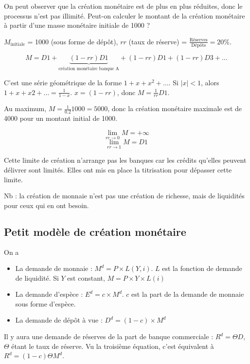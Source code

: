 	On peut observer que la création monétaire est de plus en plus réduites, donc le processus n'est pas illimité. Peut-on calculer le montant de la création monétaire à partir d'une masse monétaire initiale de 1000 ?
	
	$M_{\text{initiale}}$ = 1000 (sous forme de dépôt), $rr$ (taux de réserve) = $\frac{\text{Réserves}}{\text{Dépôts}} = 20\%$.
	
	$$M = D1 + \underbrace{(1 - rr) D1}_{\text{création monétaire banque A}} + (1 - rr) D1 + (1 - rr) D3 + \dots$$
		
	C'est une série géométrique de la forme $1 + x + x^2 + \dots$. Si $\vert x \vert < 1$, alors $1 + x + x2 + \dots = \frac{1}{1 - x}$. $x = (1 - rr)$, donc $M = \frac{1}{rr} D1$.
	
	Au maximum, $M = \frac{1}{0.2} 1000 = 5000$, donc la création monétaire maximale est de 4000 pour un montant initial de 1000.
	
	$$\lim_{rr \rightarrow 0} M = + \infty$$
	$$\lim_{rr \rightarrow 1} M = D1$$
	
	Cette limite de création n'arrange pas les banques car les crédits qu'elles peuvent délivrer sont limités. Elles ont mis en place la titrisation pour dépasser cette limite.
	
	Nb : la création de monnaie n'est pas une création de richesse, mais de liquidités pour ceux qui en ont besoin.
	
	\subsection{Petit modèle de création monétaire}
	
	
	On a
	\begin{itemize}
		\item La demande de monnaie : $ M^d = P\times L (Y, i)$. $L$ est la fonction de demande de liquidité. Si $Y$ est constant, $M = P\times Y\times L(i)$
	
		\item La demande d'espèce : $E^d = c \times M^d$. $c$ est la part de la demande de monnaie sous forme d'espèce.
	
		\item La demande de dépôt à vue : $D^d = (1 - c)\times   M^d$
	\end{itemize}
	
	Il y aura une demande de réserves de la part de banque commerciale : $R^d = \Theta D$, $\Theta$ étant le taux de réserve. Vu la troisième équation, c'est équivalent à $R^d = (1 - c)\Theta M^d$.
	
